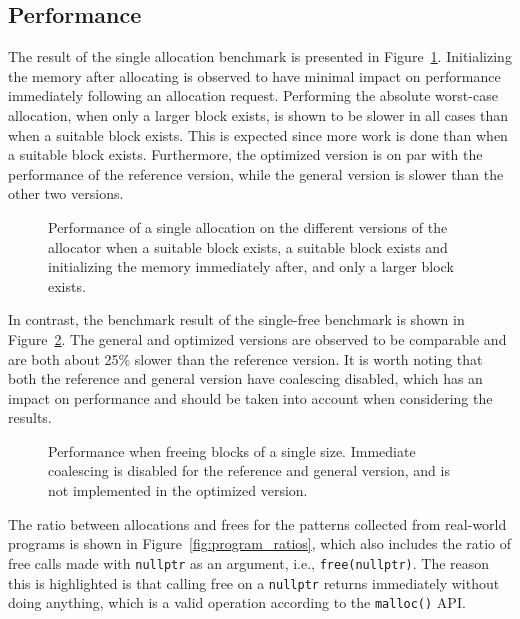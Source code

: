 
\subsection{Performance}
\label{sec:results:performance}

The result of the single allocation benchmark is presented in Figure~\ref{fig:allocation_performance}. Initializing the memory after allocating is observed to have minimal impact on performance immediately following an allocation request. Performing the absolute worst-case allocation, when only a larger block exists, is shown to be slower in all cases than when a suitable block exists. This is expected since more work is done than when a suitable block exists. Furthermore, the optimized version is on par with the performance of the reference version, while the general version is slower than the other two versions. 

\begin{figure}[]
    \centering
    
    \caption{Performance of a single allocation on the different versions of the allocator when a suitable block exists, a suitable block exists and initializing the memory immediately after, and only a larger block exists.}
    \label{fig:allocation_performance}
\end{figure}

In contrast, the benchmark result of the single-free benchmark is shown in Figure~\ref{fig:free_performance}. The general and optimized versions are observed to be comparable and are both about 25\% slower than the reference version. It is worth noting that both the reference and general version have coalescing disabled, which has an impact on performance and should be taken into account when considering the results.

\begin{figure}[]
    \centering
    
    \caption{Performance when freeing blocks of a single size. Immediate coalescing is disabled for the reference and general version, and is not implemented in the optimized version.}
    \label{fig:free_performance}
\end{figure}

The ratio between allocations and frees for the patterns collected from real-world programs is shown in Figure~\ref{fig:program_ratios}, which also includes the ratio of free calls made with \texttt{nullptr} as an argument, i.e., \texttt{free(nullptr)}. The reason this is highlighted is that calling free on a \texttt{nullptr} returns immediately without doing anything, which is a valid operation according to the \texttt{malloc()} API.

